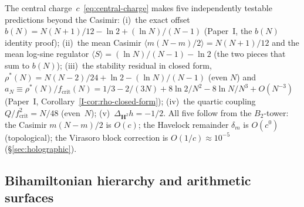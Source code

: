 The central charge~$c$~\eqref{eq:central-charge} makes five
independently testable predictions beyond the Casimir:
(i)~the exact offset
$b(N) = N(N{+}1)/12 - \ln 2 + (\ln N)/(N{-}1)$
(Paper~I, the $b(N)$ identity proof);
(ii)~the mean Casimir
$\langle m(N{-}m)/2\rangle = N(N{+}1)/12$
and the mean log-sine regulator
$\langle S\rangle = (\ln N)/(N{-}1) - \ln 2$
(the two pieces that sum to $b(N)$);
(iii)~the stability residual in closed form,
$\rho^*(N) = N(N{-}2)/24 + \ln 2 - (\ln N)/(N{-}1)$ (even $N$)
and $a_N \equiv \rho^*(N)/f_{\mathrm{crit}}(N) =
  1/3 - 2/(3N) + 8\ln 2/N^2 - 8\ln N/N^3 + O(N^{-3})$
(Paper~I, Corollary~\ref*{I-cor:rho-closed-form});
(iv)~the quartic coupling $Q/f_{\mathrm{crit}}^2 = N/48$ (even~$N$);
(v)~$\Delta_{\mathbf{H}^2} h = -1/2$.
All five follow from the $B_2$-tower:
the Casimir $m(N{-}m)/2$ is $O(c)$; the Havelock remainder $\delta_m$
is $O(c^0)$ (topological); the Virasoro block correction is
$O(1/c) \approx 10^{-5}$ (\S\ref{sec:holographic}).

\subsection{Bihamiltonian hierarchy and arithmetic surfaces}

